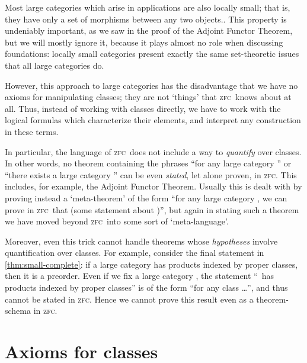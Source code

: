 \documentclass[12pt]{amsart}
\def\zfc{\textsc{zfc}}
\begin{document}
\begin{rmk}
  Most large categories which arise in applications are also locally
  small; that is, they have only a set of morphisms between any two
  objects..  This property is undeniably important, as we saw in the
  proof of the Adjoint Functor Theorem, but we will mostly ignore it,
  because it plays almost no role when discussing foundations: locally
  small categories present exactly the same set-theoretic issues that
  all large categories do.
\end{rmk}

However, this approach to large categories has the disadvantage that
we have no axioms for manipulating classes; they are not `things' that
\zfc\ knows about at all.  Thus, instead of working with classes
directly, we have to work with the logical formulas which characterize
their elements, and interpret any construction in these terms.

In particular, the language of \zfc\ does not include a way to
\emph{quantify} over classes.  In other words, no theorem containing
the phrases ``for any large category \bA'' or ``there exists a large
category \bA'' can be even \emph{stated}, let alone proven, in \zfc.
This includes, for example, the Adjoint Functor Theorem.  Usually this
is dealt with by proving instead a `meta-theorem' of the form ``for
any large category \bA, we can prove in \zfc\ that (some statement about
\bA)'', but again in stating such a theorem we have moved beyond \zfc\
into some sort of `meta-language'.

Moreover, even this trick cannot handle theorems whose
\emph{hypotheses} involve quantification over classes.  For example,
consider the final statement in \autoref{thm:small-complete}: if a
large category has products indexed by proper classes, then it is a
preorder.  Even if we fix a large category \bA, the statement ``\bA\
has products indexed by proper classes'' is of the form ``for any
class \dots'', and thus cannot be stated in \zfc.  Hence we cannot
prove this result even as a theorem-schema in \zfc.


\section{Axioms for classes}
\label{sec:nbg}
\end{document}

